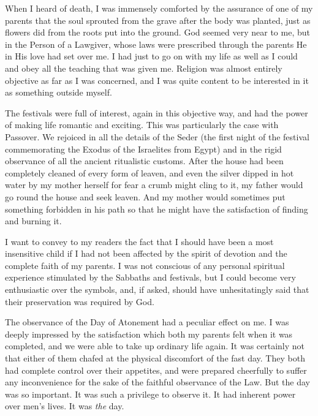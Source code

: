 When I heard of death, I was immensely comforted
by the assurance of one of my parents that the soul
sprouted from the grave after the body was planted, just
as flowers did from the roots put into the ground. God
seemed very near to me, but in the Person of a Lawgiver,
whose laws were prescribed through the parents He in
His love had set over me. I had just to go on with my
life as well as I could and obey all the teaching that was
given me. Religion was almost entirely objective as far
as I was concerned, and I was quite content to be interested
in it as something outside myself.

The festivals were full of interest, again in this
objective way, and had the power of making life romantic
and exciting. This was particularly the case with
Passover. We rejoiced in all the details of the Seder (the
first night of the festival commemorating the Exodus of
the Israelites from Egypt) and in the rigid observance
of all the ancient ritualistic customs. After the house
had been completely cleaned of every form of leaven, and
even the silver dipped in hot water by my mother herself
for fear a crumb might cling to it, my father would go
round the house and seek leaven. And my mother would
sometimes put something forbidden in his path so that
he might have the satisfaction of finding and burning it.

I want to convey to my readers the fact that I
should have been a most insensitive child if I had not
been affected by the spirit of devotion and the complete
faith of my parents. I was not conscious of any personal
spiritual experience stimulated by the Sabbaths and
festivals, but I could become very enthusiastic over
the symbols, and, if asked, should have unhesitatingly
said that their preservation was required by God.

The observance of the Day of Atonement had a
peculiar effect on me. I was deeply impressed by the
satisfaction which both my parents felt when it was
completed, and we were able to take up ordinary life
again. It was certainly not that either of them chafed
at the physical discomfort of the fast day. They both had
complete control over their appetites, and were prepared
cheerfully to suffer any inconvenience for the sake of the
faithful observance of the Law. But the day was so
important. It was such a privilege to observe it. It had
inherent power over men’s lives. It was \textsl{the} day.

